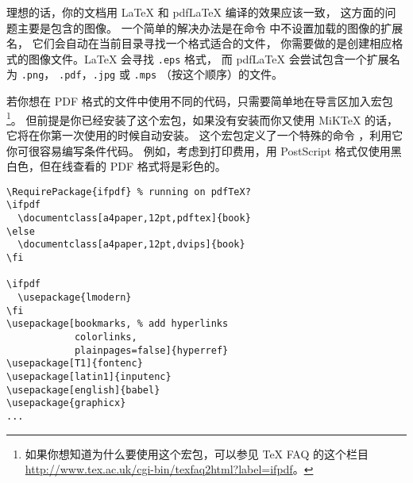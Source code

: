 
理想的话，你的文档用 \LaTeX{} 和 pdf\LaTeX{} 编译的效果应该一致，
这方面的问题主要是包含的图像。
一个简单的解决办法是在命令  中不设置加载的图像的扩展名，
它们会自动在当前目录寻找一个格式适合的文件，
你需要做的是创建相应格式的图像文件。\LaTeX{} 会寻找 \texttt{.eps} 格式，
而 pdf\LaTeX{} 会尝试包含一个扩展名 为 \texttt{.png}，
\texttt{.pdf}，\texttt{.jpg} 或 \texttt{.mps} （按这个顺序）的文件。


若你想在 PDF 格式的文件中使用不同的代码，只需要简单地在导言区加入宏包 
\footnote{如果你想知道为什么要使用这个宏包，可以参见 \TeX{} FAQ 的这个栏目\\
   \url{http://www.tex.ac.uk/cgi-bin/texfaq2html?label=ifpdf}。}。
但前提是你已经安装了这个宏包，如果没有安装而你又使用 MiK\TeX{} 的话，
它将在你第一次使用的时候自动安装。
这个宏包定义了一个特殊的命令 ，利用它你可很容易编写条件代码。
例如，考虑到打印费用，用 PostScript 
格式仅使用黑白色，但在线查看的 PDF 格式将是彩色的。

\begin{code}
\begin{verbatim}
\RequirePackage{ifpdf} % running on pdfTeX?
\ifpdf
  \documentclass[a4paper,12pt,pdftex]{book}
\else
  \documentclass[a4paper,12pt,dvips]{book}
\fi

\ifpdf
  \usepackage{lmodern}
\fi
\usepackage[bookmarks, % add hyperlinks
            colorlinks,
            plainpages=false]{hyperref}
\usepackage[T1]{fontenc}
\usepackage[latin1]{inputenc}
\usepackage[english]{babel}
\usepackage{graphicx}
...
\end{verbatim}
\end{code}


